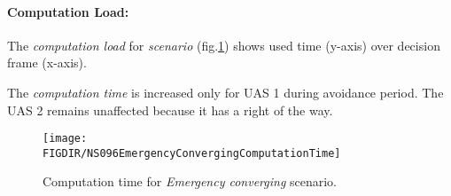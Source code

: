 \paragraph{Computation Load:} The \emph{computation load} for \emph{scenario} (fig.\ref{fig:emergencyConvergingComputationTime}) shows used time (y-axis) over decision frame (x-axis).

The \emph{computation time} is increased only for UAS 1 during avoidance period. The UAS 2 remains unaffected because it has a right of the way.

\begin{figure}[H]
    \centering
    \texttt{[image: \\FIGDIR/NS096EmergencyConvergingComputationTime]} 
    \caption{Computation time for \emph{Emergency converging} scenario.}
    \label{fig:emergencyConvergingComputationTime}
\end{figure}

